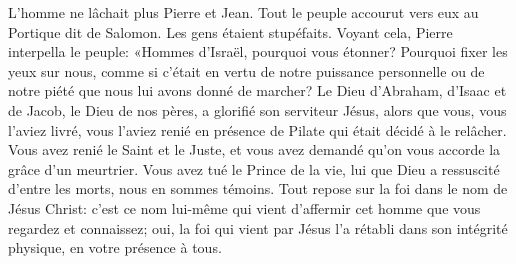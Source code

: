 L’homme ne lâchait plus Pierre et Jean.
Tout le peuple accourut vers eux au Portique dit de Salomon.
	Les gens étaient stupéfaits.
Voyant cela, Pierre interpella le peuple:
	«Hommes d’Israël, pourquoi vous étonner?
	Pourquoi fixer les yeux sur nous,
	comme si c’était en vertu de notre puissance personnelle ou de notre piété
	que nous lui avons donné de marcher?
Le Dieu d’Abraham, d’Isaac et de Jacob, le Dieu de nos pères,
	a glorifié son serviteur Jésus, alors que vous, vous l’aviez livré,
	vous l’aviez renié en présence de Pilate qui était décidé à le relâcher.
Vous avez renié le Saint et le Juste,
	et vous avez demandé qu’on vous accorde la grâce d’un meurtrier.
Vous avez tué le Prince de la vie,
	lui que Dieu a ressuscité d’entre les morts, nous en sommes témoins.
Tout repose sur la foi dans le nom de Jésus Christ:
	c’est ce nom lui-même qui vient d’affermir cet homme
		que vous regardez et connaissez;
	oui, la foi qui vient par Jésus l’a rétabli dans son intégrité physique,
	en votre présence à tous.
